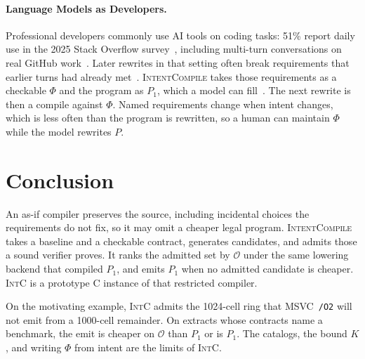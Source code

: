\paragraph{Language Models as Developers.}
Professional developers commonly use AI tools on coding tasks: 51\%
report daily use in the 2025 Stack Overflow
survey~\cite{stackoverflow2025ai}, including multi-turn conversations on
real GitHub work~\cite{hao2024chatgpt}. Later rewrites in that setting
often break requirements that earlier turns had already
met~\cite{huang2026regression,yan2026slump}.
\textsc{IntentCompile} takes those requirements as a checkable
\(\Phi\) and the program as \(P_1\), which a model can
fill~\cite{lahiri2026intent}. The next rewrite is then a compile against
\(\Phi\). Named requirements change when intent changes, which is less
often than the program is rewritten, so a human can maintain \(\Phi\)
while the model rewrites \(P\).

\section{Conclusion}
\label{sec:conclusion}

An as-if compiler preserves the source, including incidental choices the
requirements do not fix, so it may omit a cheaper legal program.
\textsc{IntentCompile} takes a baseline and a checkable contract,
generates candidates, and admits those a sound verifier proves. It ranks
the admitted set by \(\mathcal{O}\) under the same lowering backend that
compiled \(P_1\), and emits \(P_1\) when no admitted candidate is cheaper.
\textsc{IntC} is a prototype C instance of that restricted compiler.

On the motivating example, \textsc{IntC} admits the 1024-cell ring that
MSVC~\texttt{/O2} will not emit from a 1000-cell remainder. On extracts
whose contracts name a benchmark, the emit is cheaper on \(\mathcal{O}\)
than \(P_1\) or is \(P_1\). The catalogs, the bound \(K\), and writing
\(\Phi\) from intent are the limits of \textsc{IntC}.
